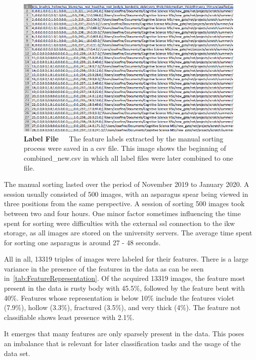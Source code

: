 \begin{figure}[!ht]
	\centering
	\includegraphics[scale=0.5]{Figures/chapter03/csv_overview.png}
	\decoRule
	\caption[Manual Labeling Output CSV-File]{\textbf{Label File}~~~The feature labels extracted by the manual sorting process were saved in a csv file. This image shows the beginning of combined\_new.csv in which all label files were later combined to one file.}
	\label{fig:CSVfileOverview}
\end{figure}

\bigskip
The manual sorting lasted over the period of November 2019 to January 2020. A session usually consisted of 500 images, with an asparagus spear being viewed in three positions from the same perspective. A session of sorting 500 images took between two and four hours. One minor factor sometimes influencing the time spent for sorting were difficulties with the external ssl connection to the \acrshort{ikw} storage, as all images are stored on the university servers. The average time spent for sorting one asparagus is around 27 - 48 seconds.

All in all, 13319 triples of images were labeled for their features. There is a large variance in the presence of the features in the data as can be seen in~\autoref{tab:FeatureRepresentation}. Of the acquired 13319 images, the feature most present in the data is rusty body with 45.5\%, followed by the feature bent with 40\%. Features whose representation is below 10\% include the features violet (7.9\%), hollow (3.3\%), fractured (3.5\%), and very thick (4\%). The feature not classifiable shows least presence with 2.1\%. 

It emerges that many features are only sparsely present in the data. This poses an imbalance that is relevant for later classification tasks and the usage of the data set.

